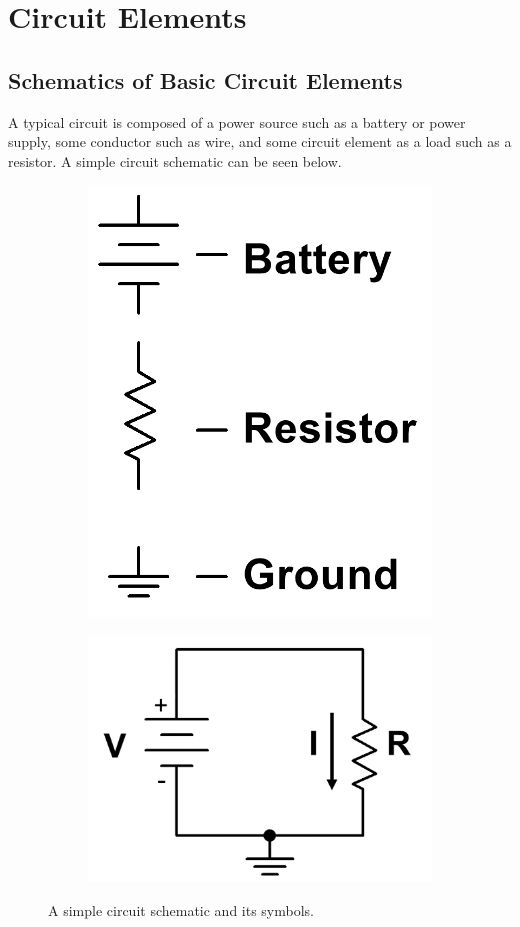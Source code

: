 \documentclass[12pt]{article}
\begin{document}
\section{Circuit Elements}
\subsection{Schematics of Basic Circuit Elements}

A typical circuit is composed of a power source such as a battery or power supply, some conductor such as wire, and some circuit element as a load such as a resistor. A simple circuit schematic can be seen below.

\begin{figure}[h]
\begin{subfigure}{.5\textwidth}
  \centering
  \includegraphics[width=0.5\linewidth]{photos/prelim/circuitschmeaticlegend.PNG}
\end{subfigure}%
\begin{subfigure}{.5\textwidth}
  \centering
  \includegraphics[width=0.8\linewidth]{photos/prelim/circuitschmeatic.png}
\end{subfigure}
\caption{A simple circuit schematic and its symbols.}
\end{figure}
\end{document}
